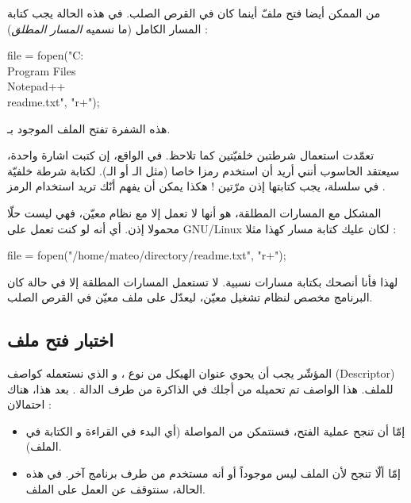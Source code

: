 من الممكن أيضا فتح ملفّ أينما كان في القرص الصلب. في هذه الحالة يجب كتابة المسار الكامل (ما نسميه
\textit{المسار المطلق}) :

\begin{Csource}
  file = fopen("C:\\Program Files\\Notepad++\\readme.txt", "r+");
\end{Csource}

هذه الشفرة تفتح الملف
الموجود بـ.

\begin{warning}
  تعمّدت استعمال شرطتبن خلفيّتين
\InlineCode{\textbackslash}
  كما تلاحظ. في الواقع، إن كتبت اشارة واحدة، سيعتقد الحاسوب أنني أريد أن استخدم رمزا خاصا (مثل الـ
أو الـ).
لكتابة شرطة خلفيّة في سلسلة، يجب كتابتها إذن مرّتين ! هكذا يمكن أن يفهم أنّك تريد استخدام الرمز
\InlineCode{\textbackslash}.
\end{warning}

المشكل مع المسارات المطلقة، هو أنها لا تعمل إلا مع نظام معيّن، فهي ليست حلّا محمولا إذن. أي أنه لو كنت تعمل على
\textenglish{GNU/Linux}
لكان عليك كتابة مسار كهذا مثلا :

\begin{Csource}
  file = fopen("/home/mateo/directory/readme.txt", "r+");
\end{Csource}

لهذا فأنا أنصحك بكتابة مسارات نسبية. لا تستعمل المسارات المطلقة إلا في حالة كان البرنامج مخصص لنظام تشغيل معيّن، ليعدّل على ملف معيّن في القرص الصلب.

\subsection{اختبار فتح ملف}
المؤشّر
يجب أن يحوي عنوان الهيكل من نوع
،
و الذي نستعمله كواصف
(\textenglish{Descriptor})
للملف. هذا الواصف تم تحميله من أجلك في الذاكرة من طرف الدالة
.
بعد هذا، هناك احتمالان :

\begin{itemize}
  \item إمّا أن تنجح عملية الفتح، فسنتمكن من المواصلة (أي البدء في القراءة و الكتابة في الملف).
  \item إمّا ألّا تنجح لأن الملف ليس موجوداً أو أنه مستخدم من طرف برنامج آخر. في هذه الحالة، سنتوقف عن العمل على الملف.
\end{itemize}

